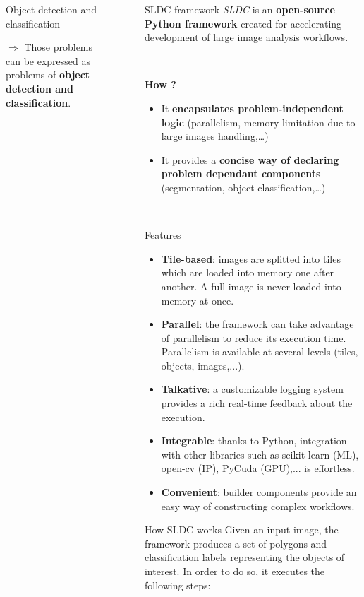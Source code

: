 \documentclass{beamer}
\begin{document}
\begin{frame}
\begin{columns}[t]
\begin{block}{Object detection and classification}
\begin{center}
\large
$\Rightarrow$ Those problems can be expressed as problems of \textbf{object detection and classification}.
\end{center}

\end{block}

~

\begin{block} {SLDC framework}
\textit{SLDC} is an \textbf{open-source Python framework} created for accelerating development of large image analysis workflows.

~

\textbf{How ?}
\begin{itemize}

\item It \textbf{encapsulates problem-independent logic} (parallelism, memory limitation due to large images handling,…)

\item It provides a \textbf{concise way of declaring problem dependant components} (segmentation, object classification,…)

\end{itemize}
~
\begin{alertblock}{Features}
\begin{itemize}
\item \textbf{Tile-based}: images are splitted into tiles which are loaded into memory one after another. A full image is never loaded into memory at once.
\item \textbf{Parallel}: the framework can take advantage of parallelism to reduce its execution time. Parallelism is available at several levels (tiles, objects, images,...).
\item \textbf{Talkative}: a customizable logging system provides a rich real-time feedback about the execution.
\item \textbf{Integrable}: thanks to Python, integration with other libraries such as scikit-learn (ML), open-cv (IP), PyCuda (GPU),... is effortless.
\item \textbf{Convenient}: builder components provide an easy way of constructing complex workflows.
\end{itemize}
\end{alertblock}

\begin{alertblock}{How SLDC works}
Given an input image, the framework produces a set of polygons and classification labels representing the objects of interest. In order to do so, it executes the following steps: 


\end{alertblock}
\end{block}
\end{columns}
\end{frame}
\end{document}
